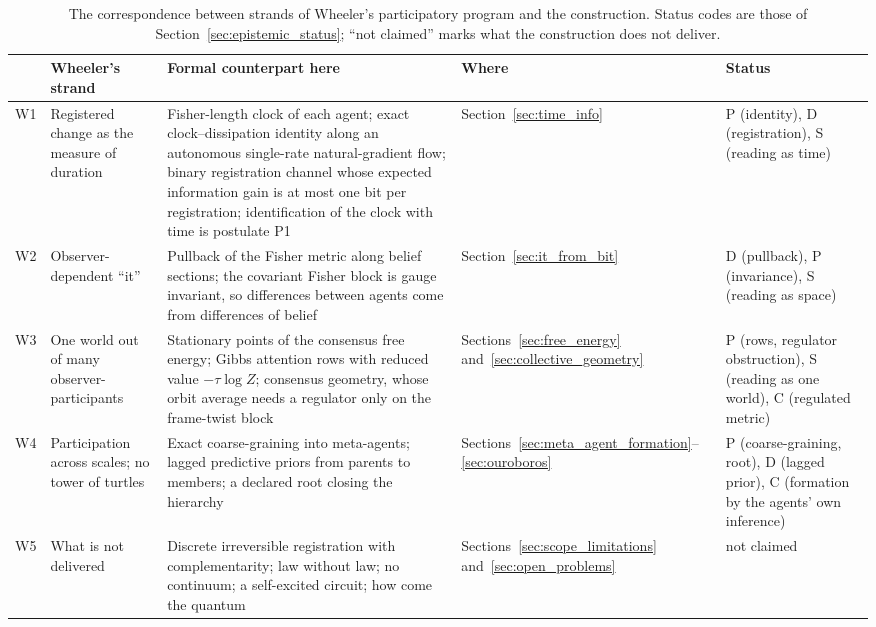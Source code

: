 \documentclass[11pt]{article}
\begin{document}
\begin{table}[t]
\centering
\small
\caption{The correspondence between strands of Wheeler's participatory program and the construction. Status codes are those of Section~\ref{sec:epistemic_status}; ``not claimed'' marks what the construction does not deliver.}
\label{tab:wheeler_correspondence}
\begin{tabularx}{\textwidth}{@{}>{\raggedright\arraybackslash}p{0.6cm}>{\raggedright\arraybackslash}p{2.4cm}>{\raggedright\arraybackslash}X>{\raggedright\arraybackslash}p{2.0cm}>{\raggedright\arraybackslash}p{2.6cm}@{}}
\toprule
 & Wheeler's strand & Formal counterpart here & Where & Status \\
\midrule
W1 & Registered change as the measure of duration & Fisher-length clock of each agent; exact clock--dissipation identity along an autonomous single-rate natural-gradient flow; binary registration channel whose expected information gain is at most one bit per registration; identification of the clock with time is postulate P1 & Section~\ref{sec:time_info} & P (identity), D (registration), S (reading as time) \\
W2 & Observer-dependent ``it'' & Pullback of the Fisher metric along belief sections; the covariant Fisher block is gauge invariant, so differences between agents come from differences of belief & Section~\ref{sec:it_from_bit} & D (pullback), P (invariance), S (reading as space) \\
W3 & One world out of many observer-participants & Stationary points of the consensus free energy; Gibbs attention rows with reduced value $-\tau\log Z$; consensus geometry, whose orbit average needs a regulator only on the frame-twist block & Sections~\ref{sec:free_energy} and~\ref{sec:collective_geometry} & P (rows, regulator obstruction), S (reading as one world), C (regulated metric) \\
W4 & Participation across scales; no tower of turtles & Exact coarse-graining into meta-agents; lagged predictive priors from parents to members; a declared root closing the hierarchy & Sections~\ref{sec:meta_agent_formation}--\ref{sec:ouroboros} & P (coarse-graining, root), D (lagged prior), C (formation by the agents' own inference) \\
W5 & What is not delivered & Discrete irreversible registration with complementarity; law without law; no continuum; a self-excited circuit; how come the quantum & Sections~\ref{sec:scope_limitations} and~\ref{sec:open_problems} & not claimed \\
\bottomrule
\end{tabularx}
\end{table}
\end{document}
